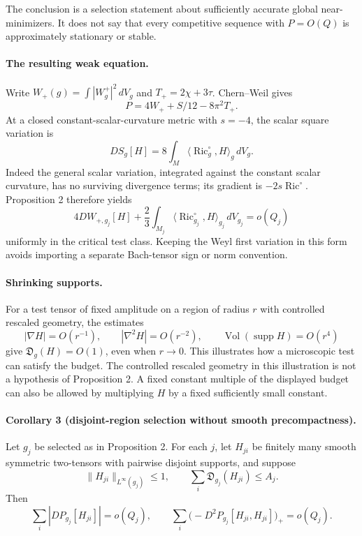 The conclusion is a selection statement about sufficiently accurate
global near-minimizers. It does not say that every competitive sequence
with $P=O(Q)$ is approximately stationary or stable.

\paragraph{The resulting weak equation.}
Write $W_+(g)=\int|W_g^+|^2\,dV_g$ and $T_+=2\chi+3\tau$.
Chern--Weil gives
\[
                 P=4W_++S/12-8\pi^2T_+.
\]
At a closed constant-scalar-curvature metric with $s=-4$, the scalar
square variation is
\[
 DS_g[H]=8\int_M\langle\operatorname{Ric}^{\circ}_g,H\rangle_g\,dV_g.
\]
Indeed the general scalar variation, integrated against the constant
scalar curvature, has no surviving divergence terms; its gradient is
$-2s\operatorname{Ric}^{\circ}$.
Proposition 2 therefore yields
\begin{equation}
 4DW_{+,g_j}[H]
 +\frac23\int_{M_j}
       \langle\operatorname{Ric}^{\circ}_{g_j},H\rangle_{g_j}\,dV_{g_j}
       =o(Q_j)
 \label{eq:o11-var-weak-equation-20260929}
\end{equation}
uniformly in the critical test class. Keeping the Weyl first variation
in this form avoids importing a separate Bach-tensor sign or norm
convention.

\paragraph{Shrinking supports.}
For a test tensor of fixed amplitude on a region of radius $r$ with
controlled rescaled geometry, the estimates
\[
 |\nabla H|=O(r^{-1}),\qquad |\nabla^2H|=O(r^{-2}),\qquad
 \operatorname{Vol}(\operatorname{supp}H)=O(r^4)
\]
give $\mathfrak D_g(H)=O(1)$, even when $r\to0$.
This illustrates how a microscopic test can satisfy the budget. The
controlled rescaled geometry in this illustration is not a hypothesis
of Proposition 2. A fixed constant multiple of the displayed budget
can also be allowed by multiplying $H$ by a fixed sufficiently small
constant.

\paragraph{Corollary 3 (disjoint-region selection without smooth precompactness).}
Let $g_j$ be selected as in Proposition 2. For each $j$, let
$H_{ji}$ be finitely many smooth symmetric two-tensors with pairwise
disjoint supports, and suppose
\[
 \|H_{ji}\|_{L^\infty(g_j)}\le1,
 \qquad \sum_i\mathfrak D_{g_j}(H_{ji})\le A_j.
\]
Then
\begin{equation}
 \sum_i|DP_{g_j}[H_{ji}]|=o(Q_j),\qquad
 \sum_i\bigl(-D^2P_{g_j}[H_{ji},H_{ji}]\bigr)_+=o(Q_j).
 \label{eq:o11-var-multiregion-20260929}
\end{equation}

